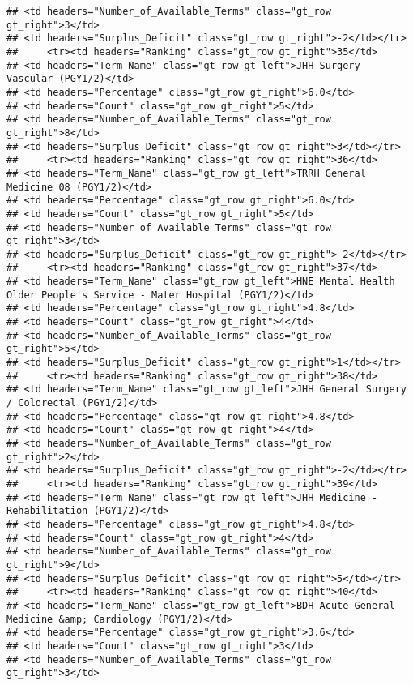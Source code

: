 \documentclass[
]{article}
\begin{document}
\begin{verbatim}
## <td headers="Number_of_Available_Terms" class="gt_row gt_right">3</td>
## <td headers="Surplus_Deficit" class="gt_row gt_right">-2</td></tr>
##     <tr><td headers="Ranking" class="gt_row gt_right">35</td>
## <td headers="Term_Name" class="gt_row gt_left">JHH Surgery - Vascular (PGY1/2)</td>
## <td headers="Percentage" class="gt_row gt_right">6.0</td>
## <td headers="Count" class="gt_row gt_right">5</td>
## <td headers="Number_of_Available_Terms" class="gt_row gt_right">8</td>
## <td headers="Surplus_Deficit" class="gt_row gt_right">3</td></tr>
##     <tr><td headers="Ranking" class="gt_row gt_right">36</td>
## <td headers="Term_Name" class="gt_row gt_left">TRRH General Medicine 08 (PGY1/2)</td>
## <td headers="Percentage" class="gt_row gt_right">6.0</td>
## <td headers="Count" class="gt_row gt_right">5</td>
## <td headers="Number_of_Available_Terms" class="gt_row gt_right">3</td>
## <td headers="Surplus_Deficit" class="gt_row gt_right">-2</td></tr>
##     <tr><td headers="Ranking" class="gt_row gt_right">37</td>
## <td headers="Term_Name" class="gt_row gt_left">HNE Mental Health Older People's Service - Mater Hospital (PGY1/2)</td>
## <td headers="Percentage" class="gt_row gt_right">4.8</td>
## <td headers="Count" class="gt_row gt_right">4</td>
## <td headers="Number_of_Available_Terms" class="gt_row gt_right">5</td>
## <td headers="Surplus_Deficit" class="gt_row gt_right">1</td></tr>
##     <tr><td headers="Ranking" class="gt_row gt_right">38</td>
## <td headers="Term_Name" class="gt_row gt_left">JHH General Surgery / Colorectal (PGY1/2)</td>
## <td headers="Percentage" class="gt_row gt_right">4.8</td>
## <td headers="Count" class="gt_row gt_right">4</td>
## <td headers="Number_of_Available_Terms" class="gt_row gt_right">2</td>
## <td headers="Surplus_Deficit" class="gt_row gt_right">-2</td></tr>
##     <tr><td headers="Ranking" class="gt_row gt_right">39</td>
## <td headers="Term_Name" class="gt_row gt_left">JHH Medicine - Rehabilitation (PGY1/2)</td>
## <td headers="Percentage" class="gt_row gt_right">4.8</td>
## <td headers="Count" class="gt_row gt_right">4</td>
## <td headers="Number_of_Available_Terms" class="gt_row gt_right">9</td>
## <td headers="Surplus_Deficit" class="gt_row gt_right">5</td></tr>
##     <tr><td headers="Ranking" class="gt_row gt_right">40</td>
## <td headers="Term_Name" class="gt_row gt_left">BDH Acute General Medicine &amp; Cardiology (PGY1/2)</td>
## <td headers="Percentage" class="gt_row gt_right">3.6</td>
## <td headers="Count" class="gt_row gt_right">3</td>
## <td headers="Number_of_Available_Terms" class="gt_row gt_right">3</td>

\end{verbatim}
\end{document}
